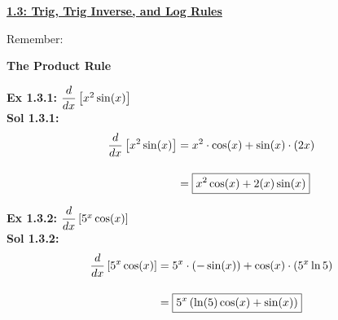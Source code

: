 \textbf{\underline{\large{1.3: Trig, Trig Inverse, and Log Rules}}} \par

Remember:
\begin{center}
\end{center}

\begin{center}
\end{center}

\newpage

\hypertarget{Product Rule}{\textbf{\large{The Product Rule}}} \par

\textbf{Ex 1.3.1: } $\dfrac{d}{dx} \left[x^2\sin (x)\right]$ \\[11pt]
\textbf{Sol 1.3.1: } \begin{align*}
    \dfrac{d}{dx} \left[x^2\sin (x)\right] & = x^2 \cdot \cos (x) + \sin (x) \cdot (2x) \\[11pt]
    & = \boxed{x^2\cos (x) + 2(x)\sin (x)}
\end{align*} 

\textbf{Ex 1.3.2: } $\dfrac{d}{dx} \left[5^x \cos (x)\right]$ \\[11pt]
\textbf{Sol 1.3.2: } \begin{align*}
    \dfrac{d}{dx} \left[5^x \cos (x)\right] & = 5^x \cdot (-\sin (x)) + \cos (x) \cdot (5^x \ln 5) \\[11pt]
    & = \boxed{5^x \left(\ln (5)\cos (x) + \sin(x)\right)}
\end{align*}

